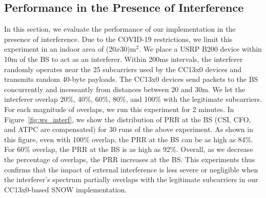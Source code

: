 \subsection{Performance in the Presence of Interference}
In this section, we evaluate the performance of our implementation in the presence of interference. Due to the COVID-19 restrictions, we limit this experiment in an indoor area of (20$x$30)m$^2$.
We place a USRP B200 device within 10m of the BS to act as an interferer. Within 200ms intervals, the interferer randomly operates near the 25 subcarriers used by the CC13x0 devices and transmits random 40-byte payloads. The CC13x0 devices send packets to the BS concurrently and incessantly 
from distances between 20 and 30m. 
We let the interferer overlap 20\%, 40\%, 60\%, 80\%, and 100\% with the legitimate subcarriers. For each magnitude of overlaps, we run this experiment for 2 minutes. In Figure~\ref{fig:ws_interf}, we show the distribution of PRR at the BS (CSI, CFO, and ATPC are compensated) for 30 runs of the above experiment.
As shown in this figure, even with 100\% overlap, the PRR at the BS can be as high as 84\%. For 60\% overlap, the PRR at the BS is as high as 92\%. Overall, as we decrease the percentage of overlaps, the PRR increases at the BS. This experiments thus confirms that the impact of external interference is less severe or negligible when the interferer's spectrum partially overlaps with the legitimate subcarriers in our CC13x0-based SNOW implementation.



